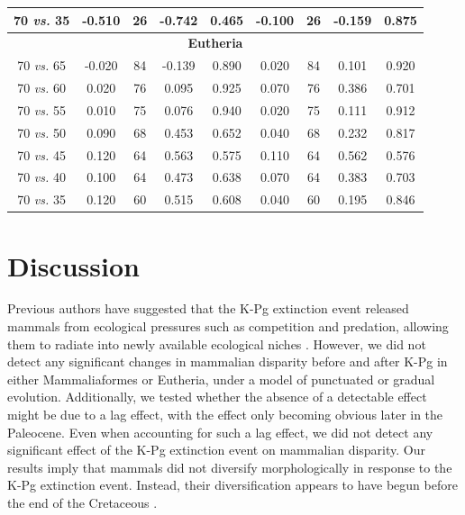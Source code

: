 \begin{table}[ht]
\begin{tabular}{c|cccc|cccc}
  70 \textit{vs.} 35 & -0.510 & 26 & -0.742 & 0.465 & -0.100 & 26 & -0.159 & 0.875 \\ 
  \hline
  \multicolumn{9}{c}{\textbf{Eutheria}}\\
  \hline
  70 \textit{vs.} 65 & -0.020 & 84 & -0.139 & 0.890 & 0.020 & 84 & 0.101 & 0.920 \\ 
  70 \textit{vs.} 60 & 0.020 & 76 & 0.095 & 0.925 & 0.070 & 76 & 0.386 & 0.701 \\ 
  70 \textit{vs.} 55 & 0.010 & 75 & 0.076 & 0.940 & 0.020 & 75 & 0.111 & 0.912 \\ 
  70 \textit{vs.} 50 & 0.090 & 68 & 0.453 & 0.652 & 0.040 & 68 & 0.232 & 0.817 \\ 
  70 \textit{vs.} 45 & 0.120 & 64 & 0.563 & 0.575 & 0.110 & 64 & 0.562 & 0.576 \\ 
  70 \textit{vs.} 40 & 0.100 & 64 & 0.473 & 0.638 & 0.070 & 64 & 0.383 & 0.703 \\ 
  70 \textit{vs.} 35 & 0.120 & 60 & 0.515 & 0.608 & 0.040 & 60 & 0.195 & 0.846 \\ 
   \hline
\end{tabular}
\end{table}


%
%

\section{Discussion}
Previous authors have suggested that the K-Pg extinction event released mammals from ecological pressures such as competition and predation, allowing them to radiate into newly available ecological niches \citep{archibald2011extinction,O'Leary08022013,Lovergrove,Slater2012MEE}.
However, we did not detect any significant changes in mammalian disparity before and after K-Pg in either Mammaliaformes or Eutheria, under a model of punctuated or gradual evolution.
Additionally, we tested whether the absence of a detectable effect might be due to a lag effect, with the effect only becoming obvious later in the Paleocene.
Even when accounting for such a lag effect, we did not detect any significant effect of the K-Pg extinction event on mammalian disparity.
Our results imply that mammals did not diversify morphologically in response to the K-Pg extinction event.
Instead, their diversification appears to have begun before the end of the Cretaceous \citep[Fig \ref{fig:Fig_Raw_results}, Table \ref{tab:Tab_results} and see ][]{meredithimpacts2011,dosReis2014,Close2015,Lee2015R759}.

